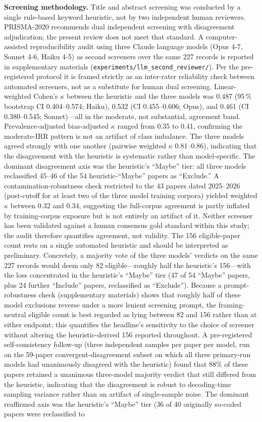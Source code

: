 \documentclass[12pt]{article}
\begin{document}
\textbf{Screening methodology.} Title and abstract screening was conducted by a single rule-based keyword heuristic, not by two independent human reviewers. PRISMA-2020 recommends dual independent screening with disagreement adjudication; the present review does not meet that standard. A computer-assisted reproducibility audit using three Claude language models (Opus 4-7, Sonnet 4-6, Haiku 4-5) as second screeners over the same 227 records is reported in supplementary materials (\texttt{experiments/llm\_second\_reviewer/}). Per the pre-registered protocol it is framed strictly as an inter-rater reliability check between automated screeners, not as a substitute for human dual screening. Linear-weighted Cohen's $\kappa$ between the heuristic and the three models was 0.487 (95\,\% bootstrap CI 0.404--0.574; Haiku), 0.532 (CI 0.455--0.606; Opus), and 0.461 (CI 0.380--0.545; Sonnet)---all in the moderate, not substantial, agreement band. Prevalence-adjusted bias-adjusted $\kappa$ \citep{Khraisha2024} ranged from 0.35 to 0.41, confirming the moderate-IRR pattern is not an artifact of class imbalance. The three models agreed strongly with one another (pairwise weighted $\kappa$ 0.81--0.86), indicating that the disagreement with the heuristic is systematic rather than model-specific. The dominant disagreement axis was the heuristic's ``Maybe'' tier: all three models reclassified 45--46 of the 54 heuristic-``Maybe'' papers as ``Exclude.'' A contamination-robustness check restricted to the 43 papers dated 2025--2026 (post-cutoff for at least two of the three model training corpora) yielded weighted $\kappa$ between 0.32 and 0.34, suggesting the full-corpus agreement is partly inflated by training-corpus exposure but is not entirely an artifact of it. Neither screener has been validated against a human consensus gold standard within this study; the audit therefore quantifies agreement, not validity. The 156 eligible-paper count rests on a single automated heuristic and should be interpreted as preliminary. Concretely, a majority vote of the three models' verdicts on the same 227 records would deem only 82 eligible---roughly half the heuristic's 156---with the loss concentrated in the heuristic's ``Maybe'' tier (47 of 54 ``Maybe'' papers, plus 24 further ``Include'' papers, reclassified as ``Exclude''). Because a prompt-robustness check (supplementary materials) shows that roughly half of these model exclusions reverse under a more lenient screening prompt, the framing-neutral eligible count is best regarded as lying between 82 and 156 rather than at either endpoint; this quantifies the headline's sensitivity to the choice of screener without altering the heuristic-derived 156 reported throughout. A pre-registered self-consistency follow-up (three independent samples per paper per model, run on the 59-paper convergent-disagreement subset on which all three primary-run models had unanimously disagreed with the heuristic) found that 88\% of these papers retained a unanimous three-model majority verdict that still differed from the heuristic, indicating that the disagreement is robust to decoding-time sampling variance rather than an artifact of single-sample noise. The dominant reaffirmed axis was the heuristic's ``Maybe'' tier (36 of 40 originally so-coded papers were reclassified to 
\end{document}
